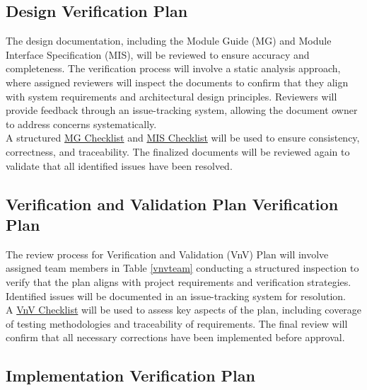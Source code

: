 \documentclass[12pt, titlepage]{article}
\begin{document}
\subsection{Design Verification Plan} \label{3.3} The design documentation,
including the Module Guide (MG) and Module Interface Specification (MIS), will
be reviewed to ensure accuracy and completeness. The verification process will
involve a static analysis approach, where assigned reviewers will inspect the
documents to confirm that they align with system requirements and architectural
design principles. Reviewers will provide feedback through an issue-tracking
system, allowing the document owner to address concerns systematically. \\
A structured
\href{https://github.com/smiths/capTemplate/blob/9251702fdcb9800c59f6ed3d11d91e2bd62fca6d/docs/Checklists/MG-Checklist.pdf}{MG
  Checklist} and
\href{https://github.com/smiths/capTemplate/blob/9251702fdcb9800c59f6ed3d11d91e2bd62fca6d/docs/Checklists/MIS-Checklist.pdf}{MIS
  Checklist} will be used to ensure consistency, correctness, and traceability.
The finalized documents will be reviewed again to validate that all identified
issues have been resolved.

\subsection{Verification and Validation Plan Verification Plan} \label{3.4} The
review process for Verification and Validation (VnV) Plan will involve assigned
team members in Table \ref{vnvteam} conducting a structured inspection to verify that the plan aligns
with project requirements and verification strategies.
Identified issues will be documented in an issue-tracking system for resolution.\\
A
\href{https://github.com/smiths/capTemplate/blob/9251702fdcb9800c59f6ed3d11d91e2bd62fca6d/docs/Checklists/VnV-Checklist.pdf}{VnV
  Checklist} will be used to assess key aspects of the plan, including coverage
of testing methodologies and traceability of requirements. The final review will
confirm that all necessary corrections have been implemented before approval.

\subsection{Implementation Verification Plan} \label{3.5}

\end{document}
